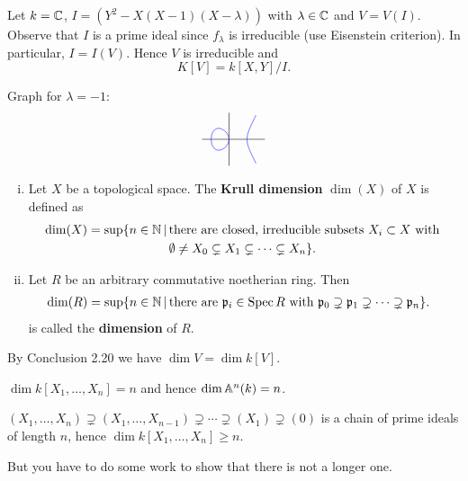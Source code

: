 
\begin{Bsp}
Let $k = \mathbb{C}$, $I=(Y^2-X(X-1)(X-\lambda))$ with $\lambda \in \mathbb{C}$ and $V=V(I)$.
Observe that $I$ is a prime ideal since $f_\lambda$ is irreducible (use Eisenstein criterion). In particular, $I=I(V)$. Hence $V$ is irreducible and
\[ K[V] = k[X,Y] / I.\]

Graph for $\lambda = -1$:
\[ \begin{tikzpicture}[scale=0.5]
\draw(-1.5,0) -- (2,0);
\draw(0,-1.5) -- (0,1.5);
\draw[smooth, domain=-1:0, variable=\x,blue] plot ({\x},{sqrt(\x*\x*\x-\x)});
\draw[smooth, domain=1:1.5, variable=\x,blue] plot ({\x},{sqrt(\x*\x*\x-\x)});
\draw[smooth, domain=-1:0, variable=\x,blue] plot ({\x},{-sqrt(\x*\x*\x-\x)});
\draw[smooth, domain=1:1.5, variable=\x,blue] plot ({\x},{-sqrt(\x*\x*\x-\x)});
\end{tikzpicture}
\]
\end{Bsp}

\begin{defi}
\begin{enumerate}[(i)]
\item Let $X$ be a topological space. The \textbf{Krull dimension} $\dim(X)$ of $X$ is defined as
\begin{align*}
	\dim(X) = \sup \{ n \in \mathbb{N} \, | \, &\text{there are closed, irreducible subsets } X_i \subset X \text{ with } \\
	&\emptyset \neq X_0 \subsetneq X_1 \subsetneq \cdots \subsetneq X_n \}.
\end{align*}
\item Let $R$ be an arbitrary commutative noetherian ring. Then
\begin{align*}
\dim(R) = \sup \{ n \in \mathbb{N} \, | \, &\text{there are  } \mathfrak{p}_i \in \operatorname{Spec} R \text{ with } 
 \mathfrak{p}_0 \supsetneq \mathfrak{p}_1 \supsetneq \cdots \supsetneq \mathfrak{p}_n \}.
\end{align*}
is called the \textbf{dimension} of $R$.
\end{enumerate}
\end{defi}

\begin{Bem}
	By Conclusion 2.20 we have $\dim V = \dim k[V]$.
\end{Bem}

\begin{Fakt}
	$\dim k[X_1, \dots, X_n] =n$ and hence $\dim \mathbb{A}^n(k) = n$.
\end{Fakt}


\begin{Beob*}
	$ (X_1, \dots, X_n) \supsetneq (X_1, \dots, X_{n-1} )\supsetneq \cdots \supsetneq (X_1) \supsetneq (0)$
	is a chain of prime ideals of length $n$, hence $\dim k[X_1, \dots, X_n] \geq n$.
	
	But you have to do some work to show that there is not a longer one.
\end{Beob*}

